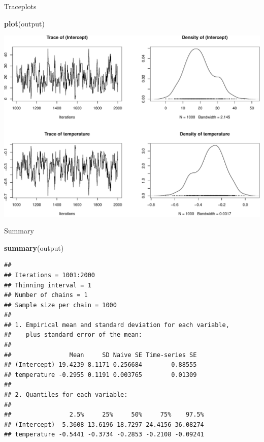 \documentclass[
  ignorenonframetext,
]{beamer}
\newenvironment{Shaded}{\begin{snugshade}}{\end{snugshade}}
\newcommand{\KeywordTok}[1]{\textcolor[rgb]{0.13,0.29,0.53}{\textbf{#1}}}
\newcommand{\NormalTok}[1]{#1}
\begin{document}
\begin{frame}[fragile]{Traceplots}
\protect\hypertarget{traceplots}{}

\footnotesize

\begin{Shaded}
\begin{Highlighting}[]
\KeywordTok{plot}\NormalTok{(output)}
\end{Highlighting}
\end{Shaded}

\includegraphics{9-logistic-regression_files/figure-beamer/unnamed-chunk-5-1.pdf}

\end{frame}

\begin{frame}[fragile]{Summary}
\protect\hypertarget{summary}{}

\footnotesize

\begin{Shaded}
\begin{Highlighting}[]
\KeywordTok{summary}\NormalTok{(output)}
\end{Highlighting}
\end{Shaded}

\begin{verbatim}
## 
## Iterations = 1001:2000
## Thinning interval = 1 
## Number of chains = 1 
## Sample size per chain = 1000 
## 
## 1. Empirical mean and standard deviation for each variable,
##    plus standard error of the mean:
## 
##                Mean     SD Naive SE Time-series SE
## (Intercept) 19.4239 8.1171 0.256684        0.88555
## temperature -0.2955 0.1191 0.003765        0.01309
## 
## 2. Quantiles for each variable:
## 
##                2.5%     25%     50%     75%    97.5%
## (Intercept)  5.3608 13.6196 18.7297 24.4156 36.08274
## temperature -0.5441 -0.3734 -0.2853 -0.2108 -0.09241
\end{verbatim}

\end{frame}
\end{document}

